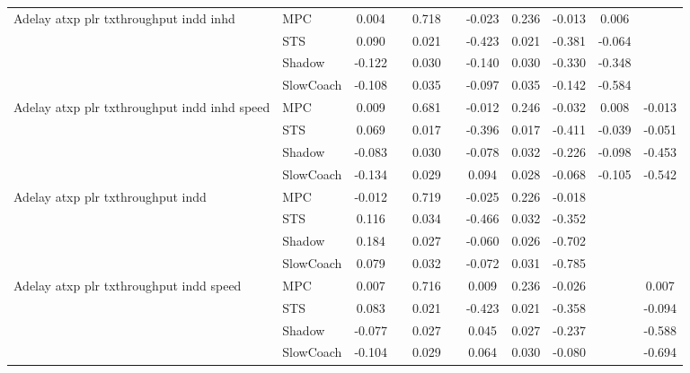 \begin{tabular}{|l|l|*{9}{c|}}
Adelay atxp plr txthroughput indd inhd    & MPC &    0.004 &        &     0.718 &     & -0.023 &  0.236 &  -0.013 &   0.006 &       \\
                              & STS &    0.090 &        &     0.021 &     & -0.423 &  0.021 &  -0.381 &  -0.064 &       \\
                              & Shadow &   -0.122 &        &     0.030 &     & -0.140 &  0.030 &  -0.330 &  -0.348 &       \\
                              & SlowCoach &   -0.108 &        &     0.035 &     & -0.097 &  0.035 &  -0.142 &  -0.584 &       \\
\midrule
Adelay atxp plr txthroughput indd inhd speed    & MPC &    0.009 &        &     0.681 &     & -0.012 &  0.246 &  -0.032 &   0.008 &   -0.013 \\
                              & STS &    0.069 &        &     0.017 &     & -0.396 &  0.017 &  -0.411 &  -0.039 &   -0.051 \\
                              & Shadow &   -0.083 &        &     0.030 &     & -0.078 &  0.032 &  -0.226 &  -0.098 &   -0.453 \\
                              & SlowCoach &   -0.134 &        &     0.029 &     &  0.094 &  0.028 &  -0.068 &  -0.105 &   -0.542 \\
\midrule
Adelay atxp plr txthroughput indd    & MPC &   -0.012 &        &     0.719 &     & -0.025 &  0.226 &  -0.018 &      &       \\
                              & STS &    0.116 &        &     0.034 &     & -0.466 &  0.032 &  -0.352 &      &       \\
                              & Shadow &    0.184 &        &     0.027 &     & -0.060 &  0.026 &  -0.702 &      &       \\
                              & SlowCoach &    0.079 &        &     0.032 &     & -0.072 &  0.031 &  -0.785 &      &       \\
\midrule
Adelay atxp plr txthroughput indd speed    & MPC &    0.007 &        &     0.716 &     &  0.009 &  0.236 &  -0.026 &      &    0.007 \\
                              & STS &    0.083 &        &     0.021 &     & -0.423 &  0.021 &  -0.358 &      &   -0.094 \\
                              & Shadow &   -0.077 &        &     0.027 &     &  0.045 &  0.027 &  -0.237 &      &   -0.588 \\
                              & SlowCoach &   -0.104 &        &     0.029 &     &  0.064 &  0.030 &  -0.080 &      &   -0.694 \\

\end{tabular}
